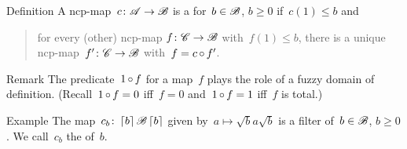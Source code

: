 \documentclass[b]{subfiles}
\begin{document}
\begin{parsec}%
\begin{point}{Definition}%
A ncp-map~$c \colon \mathscr{A} \to \mathscr{B}$
    is a  for~$b \in\mathscr{B}$, $b \geq 0$ if~$c(1)\leq b$
    and
    \begin{quote}
        for every (other) ncp-map $f\colon \mathscr{C} \to \mathscr{B}$
            with~$f(1) \leq b$,
            there is a unique ncp-map~$f'\colon \mathscr{C} \to \mathscr{B}$
            with~$f = c \mathop{\circ} f'$.
    \end{quote}
\begin{point}{Remark}%
The predicate~$1 \mathop{\circ} f$
    for a map~$f$ plays
    the role of a fuzzy domain of definition.
(Recall~$1 \mathop{\circ} f = 0$ iff~$f = 0$
    and~$1 \mathop{\circ} f = 1$ iff~$f$ is total.)
\end{point}
\end{point}
\begin{point}{Example}%
    The map~$c_b\colon \left\lceil b\right\rceil \mathscr{B} \left\lceil b\right\rceil$
        given by~$a \mapsto \sqrt{b} a \sqrt{b}$ is a filter
        of~$b\in \mathscr{B}$, $b\geq 0$.
    We call~$c_b$ the  of~$b$.
\end{point}
\end{parsec}
\end{document}
